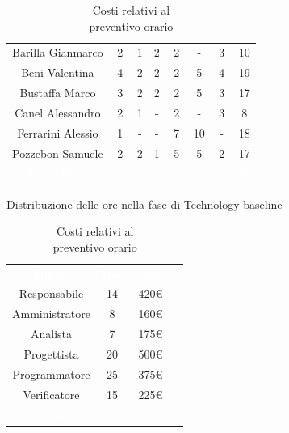 \begin{table}[h!]
\begin{minipage}[c]{0.53\textwidth}
\begin{tabular}{>{\raggedright\arraybackslash}c|cccccc|c}
		\rowcolor[RGB]{216, 235, 171}
	    	Barilla Gianmarco & 2 & 1 & 2 & 2 & - & 3& 10		\\[4pt]
	    \rowcolor[RGB]{233, 245, 206}
	    	Beni Valentina & 4 & 2 & 2 & 2 & 5 & 4& 19			\\[4pt]
	    \rowcolor[RGB]{216, 235, 171}
	    	Bustaffa Marco & 3 & 2 & 2 & 2 & 5 & 3& 17			\\[4pt]
        \rowcolor[RGB]{233, 245, 206}
	    	Canel Alessandro & 2 & 1 & - & 2 & - & 3& 8			\\[4pt]
        \rowcolor[RGB]{216, 235, 171}
	    	Ferrarini Alessio & 1 & - & - & 7 & 10 & -& 18		\\[4pt]
        \rowcolor[RGB]{233, 245, 206}
	    	Pozzebon Samuele & 2 & 2 & 1 & 5 & 5 & 2& 17			\\[4pt]
		\rowcolor[RGB]{47, 106, 73}
			\textcolor{white}{Totale Ruolo} & \textcolor{white}{14} & \textcolor{white}{8} & \textcolor{white}{7} 
			& \textcolor{white}{20} & \textcolor{white}{25} & \textcolor{white}{15}
			& \textcolor{white}{89} \\[4pt]	
    \end{tabular}
    \caption{Distribuzione delle ore nella fase di Technology baseline}
\end{minipage}
\hfill
\begin{minipage}{0.33\textwidth}
	\centering
	\begin{tabular}{cccc}
	    \rowcolor[RGB]{33, 73, 50}
	    \textcolor{white}{\textbf{Ruolo}} & \textcolor{white}{\textbf{Ore}} & \textcolor{white}{\textbf{Costo}}\\[4pt]
	    \rowcolor[RGB]{216, 235, 171}
	    Responsabile & 14 & 420\euro\\[4pt]
	    \rowcolor[RGB]{233, 245, 206}
	    Amministratore & 8 & 160\euro\\[4pt]
        \rowcolor[RGB]{216, 235, 171}
	    Analista & 7 & 175\euro\\[4pt]
	    \rowcolor[RGB]{233, 245, 206}
	    Progettista & 20 & 500\euro\\[4pt]
        \rowcolor[RGB]{216, 235, 171}
	    Programmatore & 25 & 375\euro\\[4pt]
	    \rowcolor[RGB]{233, 245, 206}
	    Verificatore & 15 & 225\euro\\[4pt]
		\rowcolor[RGB]{47, 106, 73}
			\textcolor{white}{Totale} & \textcolor{white}{89} & \textcolor{white}{1855\euro}\\[4pt]	
    \end{tabular}	
	\caption{Costi relativi al \\ preventivo orario}

\end{minipage}
\end{table}

